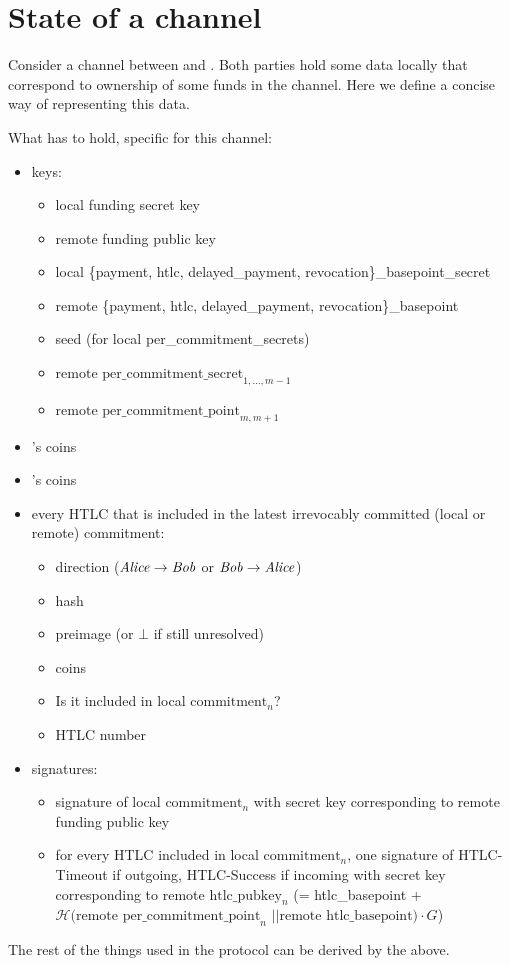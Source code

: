 \section{State of a channel}
  Consider a channel between \alice{} and \bob. Both parties hold some data
  locally that correspond to ownership of some funds in the channel. Here we
  define a concise way of representing this data.

  What \alice{} has to hold, specific for this channel:
  \begin{itemize}
    \item keys:
    \begin{itemize}
      \item local funding secret key
      \item remote funding public key
      \item local \{payment, htlc, delayed\_payment,
      revocation\}\_basepoint\_secret
      \item remote \{payment, htlc, delayed\_payment, revocation\}\_basepoint
      \item seed (for local per\_commitment\_secrets)
      \item $\text{remote per\_commitment\_secret}_{1, \dots, m-1}$
      \item $\text{remote per\_commitment\_point}_{m, m+1}$
    \end{itemize}
    \item \alice's coins
    \item \bob's coins
    \item every HTLC that is included in the latest irrevocably committed (local
    or remote) commitment:
      \begin{itemize}
        \item direction ($\mathit{Alice} \rightarrow \mathit{Bob}$ or $\mathit{Bob} \rightarrow \mathit{Alice}$)
        \item hash
        \item preimage (or $\bot$ if still unresolved)
        \item coins
        \item Is it included in local $\mathrm{commitment}_n$?
        \item HTLC number
      \end{itemize}
    \item signatures:
    \begin{itemize}
      \item signature of local $\mathrm{commitment}_n$ with secret key
      corresponding to remote funding public key
      \item for every HTLC included in local $\mathrm{commitment}_n$, one
      signature of HTLC-Timeout if outgoing, HTLC-Success if incoming with
      secret key corresponding to remote $\mathrm{htlc\_pubkey}_n$ (=
      htlc\_basepoint + $\mathcal{H}(\text{remote per\_commitment\_point}_n$ $||
      \text{remote htlc\_basepoint}) \cdot G$)
    \end{itemize}
  \end{itemize}
  The rest of the things used in the protocol can be derived by the above.
